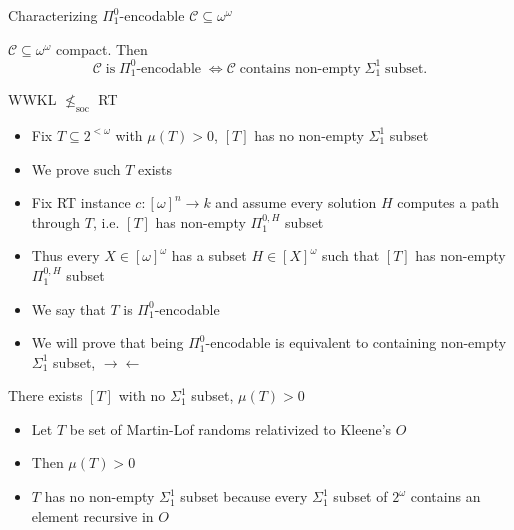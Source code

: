 \begin{frame}{Characterizing $\Pi_1^0$-encodable
$\mathcal{C}\subseteq\omega^\omega$}
  \begin{thm}
    $\mathcal{C}\subseteq \omega^{\omega}$ compact. Then
    \[\mathcal{C}\; \text{is}\; \Pi_1^0\text{-encodable}\; \Leftrightarrow
    \mathcal{C}\; \text{contains non-empty}\; \Sigma_1^1\; \text{subset}.\]
  \end{thm}
\end{frame}

\begin{frame}{WWKL $\nleq_{\text{soc}}$ RT}
  \begin{itemize}
    \item Fix $T\subseteq 2^{<\omega}$ with $\mu(T)>0$, $[T]$
      has no non-empty $\Sigma_1^1$ subset
    \item We prove such $T$ exists
    \item Fix RT instance $c:[\omega]^n\rightarrow k$ and assume every
      solution $H$ computes a path through $T$, i.e. $[T]$ has non-empty
      $\Pi_1^{0,H}$ subset
    \item Thus every $X\in[\omega]^\omega$ has a subset
      $H\in[X]^\omega$ such that $[T]$ has non-empty $\Pi_1^{0,H}$ subset
    \item We say that $T$ is $\Pi_1^0$-encodable
    \item We will prove that being $\Pi_1^0$-encodable is equivalent to
      containing non-empty $\Sigma_1^1$ subset, $\rightarrow\leftarrow$
  \end{itemize}
\end{frame}

\begin{frame}{There exists $[T]$ with no $\Sigma_1^1$ subset, $\mu(T)>0$}
  \begin{itemize}
    \item Let $T$ be set of Martin-Lof randoms relativized to Kleene's $O$
    \item Then $\mu(T)>0$
    \item $T$ has no non-empty $\Sigma_1^1$ subset because every
      $\Sigma_1^1$ subset of $2^\omega$ contains an element recursive in
      $O$
  \end{itemize}
\end{frame}

